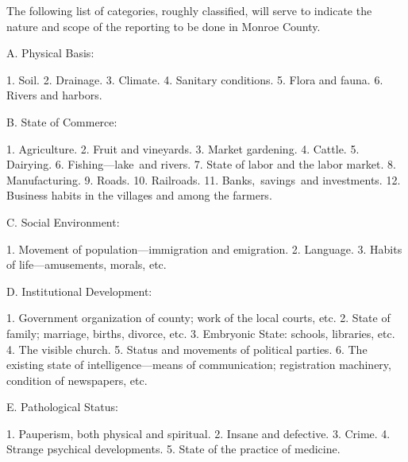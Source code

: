 \documentclass[twoside,symmetric,nobib,justified]{tufte-book}
\begin{document}
The following list of categories, roughly classified, will serve to
indicate the nature and scope of the reporting to be done in Monroe
County.~

\vspace{.05in}

A. Physical Basis:~

1. Soil. 2. Drainage. 3. Climate. 4. Sanitary conditions. 5. Flora and
fauna. 6. Rivers and harbors.~

\vspace{.05in}

B. State of Commerce:~

1. Agriculture. 2. Fruit and vineyards. 3. Market gardening. 4. Cattle.
5. Dairying. 6. Fishing---lake~and rivers. 7. State of labor and the
labor market. 8. Manufacturing. 9. Roads. 10. Railroads. 11.
Banks,~savings~and investments. 12. Business habits in the villages and
among the farmers.~

\vspace{.05in}

C. Social Environment:~

1. Movement of population---immigration and emigration. 2. Language. 3.
Habits of life---amusements, morals, etc.~

\vspace{.05in}

D. Institutional Development:~

1. Government organization of county; work of the local courts, etc. 2.
State of family; marriage, births, divorce, etc. 3. Embryonic State:
schools, libraries, etc. 4. The visible church. 5. Status and movements
of political parties. 6. The existing state of intelligence---means of
communication; registration machinery, condition of newspapers, etc.~

\vspace{.05in}

E. Pathological Status:~

1. Pauperism, both physical and spiritual. 2. Insane and defective. 3.
Crime. 4. Strange psychical developments. 5. State of the practice of
medicine.~

\vspace{.05in}
\end{document}

